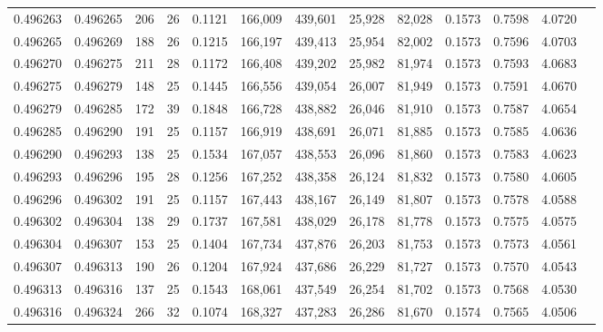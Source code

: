 \begin{tabular}{rrrrrrrrrrrrr}
0.496263 & 0.496265 & 206 &  26 &                                     0.1121 & 166,009 & 439,601 &  25,928 &  82,028 & 0.1573 & 0.7598 & 4.0720 \\
0.496265 & 0.496269 & 188 &  26 &                                     0.1215 & 166,197 & 439,413 &  25,954 &  82,002 & 0.1573 & 0.7596 & 4.0703 \\
0.496270 & 0.496275 & 211 &  28 &                                     0.1172 & 166,408 & 439,202 &  25,982 &  81,974 & 0.1573 & 0.7593 & 4.0683 \\
0.496275 & 0.496279 & 148 &  25 &                                     0.1445 & 166,556 & 439,054 &  26,007 &  81,949 & 0.1573 & 0.7591 & 4.0670 \\
0.496279 & 0.496285 & 172 &  39 &                                     0.1848 & 166,728 & 438,882 &  26,046 &  81,910 & 0.1573 & 0.7587 & 4.0654 \\
0.496285 & 0.496290 & 191 &  25 &                                     0.1157 & 166,919 & 438,691 &  26,071 &  81,885 & 0.1573 & 0.7585 & 4.0636 \\
0.496290 & 0.496293 & 138 &  25 &                                     0.1534 & 167,057 & 438,553 &  26,096 &  81,860 & 0.1573 & 0.7583 & 4.0623 \\
0.496293 & 0.496296 & 195 &  28 &                                     0.1256 & 167,252 & 438,358 &  26,124 &  81,832 & 0.1573 & 0.7580 & 4.0605 \\
0.496296 & 0.496302 & 191 &  25 &                                     0.1157 & 167,443 & 438,167 &  26,149 &  81,807 & 0.1573 & 0.7578 & 4.0588 \\
0.496302 & 0.496304 & 138 &  29 &                                     0.1737 & 167,581 & 438,029 &  26,178 &  81,778 & 0.1573 & 0.7575 & 4.0575 \\
0.496304 & 0.496307 & 153 &  25 &                                     0.1404 & 167,734 & 437,876 &  26,203 &  81,753 & 0.1573 & 0.7573 & 4.0561 \\
0.496307 & 0.496313 & 190 &  26 &                                     0.1204 & 167,924 & 437,686 &  26,229 &  81,727 & 0.1573 & 0.7570 & 4.0543 \\
0.496313 & 0.496316 & 137 &  25 &                                     0.1543 & 168,061 & 437,549 &  26,254 &  81,702 & 0.1573 & 0.7568 & 4.0530 \\
0.496316 & 0.496324 & 266 &  32 &                                     0.1074 & 168,327 & 437,283 &  26,286 &  81,670 & 0.1574 & 0.7565 & 4.0506 \\

\end{tabular}

